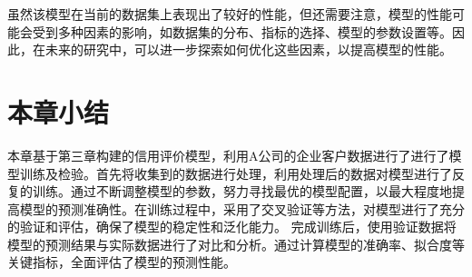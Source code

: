  虽然该模型在当前的数据集上表现出了较好的性能，但还需要注意，模型的性能可能会受到多种因素的影响，如数据集的分布、指标的选择、模型的参数设置等。因此，在未来的研究中，可以进一步探索如何优化这些因素，以提高模型的性能。
\section{本章小结}
本章基于第三章构建的信用评价模型，利用A公司的企业客户数据进行了进行了模型训练及检验。首先将收集到的数据进行处理，利用处理后的数据对模型进行了反复的训练。通过不断调整模型的参数，努力寻找最优的模型配置，以最大程度地提高模型的预测准确性。在训练过程中，采用了交叉验证等方法，对模型进行了充分的验证和评估，确保了模型的稳定性和泛化能力。
完成训练后，使用验证数据将模型的预测结果与实际数据进行了对比和分析。通过计算模型的准确率、拟合度等关键指标，全面评估了模型的预测性能。